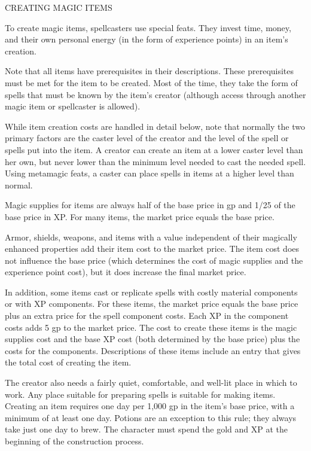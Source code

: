 \vspace{12pt}
{\LARGE CREATING MAGIC ITEMS}

To create magic items, spellcasters use special feats. They invest time, money, 
and their own personal energy (in the form of experience points) in an item's creation.

Note that all items have prerequisites in their descriptions. These prerequisites 
must be met for the item to be created. Most of the time, they take the form of 
spells that must be known by the item's creator (although access through another 
magic item or spellcaster is allowed).

While item creation costs are handled in detail below, note that normally the two 
primary factors are the caster level of the creator and the level of the spell 
or spells put into the item. A creator can create an item at a lower caster level 
than her own, but never lower than the minimum level needed to cast the needed 
spell. Using metamagic feats, a caster can place spells in items at a higher level 
than normal.

Magic supplies for items are always half of the base price in gp and 1/25 of the 
base price in XP. For many items, the market price equals the base price.

Armor, shields, weapons, and items with a value independent of their magically 
enhanced properties add their item cost to the market price. The item cost does 
not influence the base price (which determines the cost of magic supplies and the 
experience point cost), but it does increase the final market price.

In addition, some items cast or replicate spells with costly material components 
or with XP components. For these items, the market price equals the base price 
plus an extra price for the spell component costs. Each XP in the component costs 
adds 5 gp to the market price. The cost to create these items is the magic supplies 
cost and the base XP cost (both determined by the base price) plus the costs for 
the components. Descriptions of these items include an entry that gives the total 
cost of creating the item.

The creator also needs a fairly quiet, comfortable, and well-lit place in which 
to work. Any place suitable for preparing spells is suitable for making items. 
Creating an item requires one day per 1,000 gp in the item's base price, with a 
minimum of at least one day. Potions are an exception to this rule; they always 
take just one day to brew. The character must spend the gold and XP at the beginning 
of the construction process.


